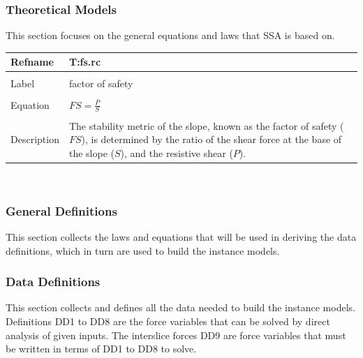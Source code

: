 \documentclass[12pt]{article}
\begin{document}
\subsubsection{Theoretical Models}
\label{Sec:TM}
This section focuses on the general equations and laws that SSA is based on.
~\newline
\noindent \begin{minipage}{\textwidth}
\begin{tabular}{p{} p{}}
\toprule \textbf{Refname} & \textbf{T:fs.rc}
\label{T:fs.rc}
\\ \midrule \\
Label & factor of safety
\\ \midrule \\
Equation & $FS=\frac{P}{S}$
\\ \midrule \\
Description & The stability metric of the slope, known as the factor of safety ($FS$), is determined by the ratio of the shear force at the base of the slope ($S$), and the resistive shear ($P$).
\\ \bottomrule \end{tabular}
\end{minipage}\\
\subsubsection{General Definitions}
\label{Sec:GD}
This section collects the laws and equations that will be used in deriving the data definitions, which in turn are used to build the instance models.
\subsubsection{Data Definitions}
\label{Sec:DD}
This section collects and defines all the data needed to build the instance models. Definitions DD1 to DD8 are the force variables that can be solved by direct analysis of given inputs. The interslice forces DD9 are force variables that must be written in terms of DD1 to DD8 to solve.
\end{document}
